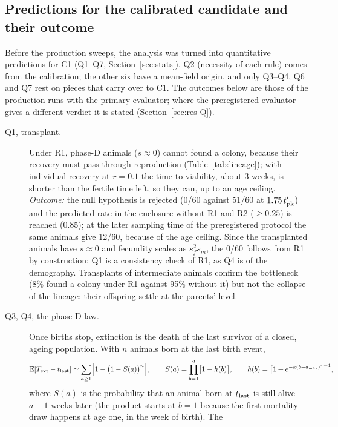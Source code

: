 \subsection{Predictions for the calibrated candidate and their outcome}
\label{sec:mf-predictions}

Before the production sweeps, the analysis was turned into quantitative predictions for \textsf{C1} (Q1--Q7,
Section~\ref{sec:stats}). Q2 (necessity of each rule) comes from the calibration; the other six have a mean-field
origin, and only Q3--Q4, Q6 and Q7 rest on pieces that carry over to \textsf{C1}. The outcomes below are those of
the production runs with the primary evaluator; where the preregistered evaluator gives a different verdict it is stated
(Section~\ref{sec:res-Q}).

\begin{description}
\item[Q1, transplant.] Under R1, phase-D animals ($s\approx0$) cannot found a colony, because their recovery must
  pass through reproduction (Table~\ref{tab:lineage}); with individual recovery at $r=0.1$ the time to viability,
  about 3 weeks, is shorter than the fertile time left, so they can, up to an age ceiling.
  \emph{Outcome:} the null hypothesis is rejected (0/60 against 51/60 at $1.75\,t'_{\rm pk}$) and the predicted rate
  in the enclosure without R1 and R2 ($\ge0.25$) is reached (0.85); at the later sampling time of the preregistered
  protocol the same animals give 12/60, because of the age ceiling. Since the transplanted animals have $s\approx0$
  and fecundity scales as $s_f^2s_m$, the 0/60 follows from R1 by construction: Q1 is a consistency check of R1, as
  Q4 is of the demography. Transplants of intermediate animals confirm the bottleneck (8\% found a colony under R1
  against 95\% without it) but not the collapse of the lineage: their offspring settle at the parents' level.
\item[Q3, Q4, the phase-D law.] Once births stop, extinction is the death of the last survivor of a closed, ageing
  population. With $n$ animals born at the last birth event,
  \begin{equation}
    \mathbb E[T_{\rm ext}-t_{\rm last}]\simeq\sum_{a\ge1}\Bigl[1-\bigl(1-S(a)\bigr)^n\Bigr],\qquad
    S(a)=\prod_{b=1}^{a}\bigl[1-h(b)\bigr],\qquad
    h(b)=\bigl[1+e^{-k(b-a_{\max})}\bigr]^{-1},
    \label{eq:phaseD}
  \end{equation}
  where $S(a)$ is the probability that an animal born at $t_{\rm last}$ is still alive $a-1$ weeks later (the
  product starts at $b=1$ because the first mortality draw happens at age one, in the week of birth). The

\end{description}
